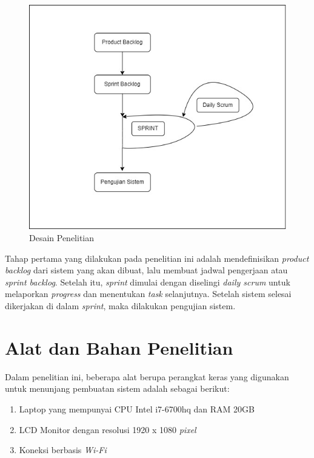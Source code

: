\begin{figure}[H]
	\centering
	\includegraphics[keepaspectratio, width=13cm]{gambar/desain_penelitian}
	\caption{Desain Penelitian}
	\label{gambar:desain_penelitian}
\end{figure}

Tahap pertama yang dilakukan pada penelitian ini adalah mendefinisikan \textit{product backlog} dari sistem yang akan dibuat, lalu membuat jadwal pengerjaan atau \textit{sprint backlog}. Setelah itu, \textit{sprint} dimulai dengan diselingi \textit{daily scrum} untuk melaporkan \textit{progress} dan menentukan \textit{task} selanjutnya. Setelah sistem selesai dikerjakan di dalam \textit{sprint}, maka dilakukan pengujian sistem.

\section{Alat dan Bahan Penelitian}

Dalam penelitian ini, beberapa alat berupa perangkat keras yang digunakan untuk menunjang pembuatan sistem adalah sebagai berikut:

\begin{enumerate}

\item{Laptop yang mempunyai CPU Intel i7-6700hq dan RAM 20GB}
\item{LCD Monitor dengan resolusi 1920 x 1080 \textit{pixel}}
\item{Koneksi berbasis \textit{Wi-Fi}}

\end{enumerate}

